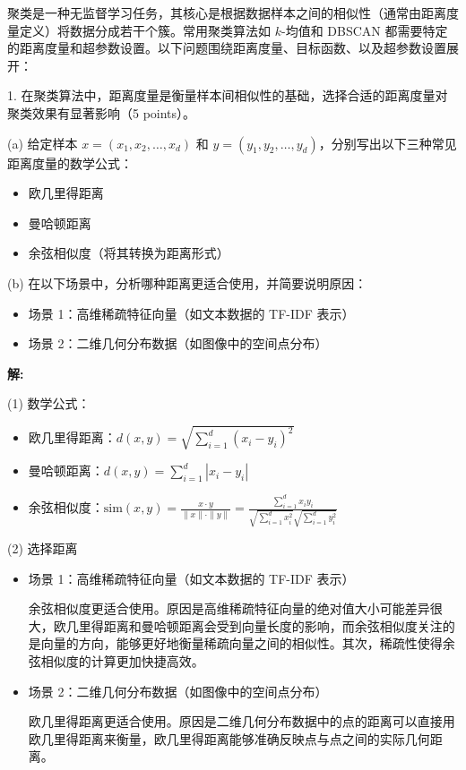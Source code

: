 \documentclass[8pt]{article}
\begin{document}
聚类是一种无监督学习任务，其核心是根据数据样本之间的相似性（通常由距离度量定义）将数据分成若干个簇。常用聚类算法如 \( k \)-均值和 DBSCAN 都需要特定的距离度量和超参数设置。以下问题围绕距离度量、目标函数、以及超参数设置展开：  

1. 
在聚类算法中，距离度量是衡量样本间相似性的基础，选择合适的距离度量对聚类效果有显著影响（5 points）。  

(a) 给定样本 \( x = (x_1, x_2, \dots, x_d) \) 和 \( y = (y_1, y_2, \dots, y_d) \)，分别写出以下三种常见距离度量的数学公式： 
\begin{itemize}
    \item 欧几里得距离  
    \item 曼哈顿距离
    \item 余弦相似度（将其转换为距离形式）  
\end{itemize}

(b) 在以下场景中，分析哪种距离更适合使用，并简要说明原因：  
\begin{itemize}
    \item 场景 1：高维稀疏特征向量（如文本数据的 TF-IDF 表示）   
    \item 场景 2：二维几何分布数据（如图像中的空间点分布）  
\end{itemize}

\textbf{\large 解:}

(1) 数学公式：
\begin{itemize}
    \item 欧几里得距离：\( d(x, y) = \sqrt{\sum_{i=1}^d (x_i - y_i)^2} \)
    \item 曼哈顿距离：\( d(x, y) = \sum_{i=1}^d |x_i - y_i| \)
    \item 余弦相似度：\( \text{sim}(x, y) = \frac{x \cdot y}{\|x\| \cdot \|y\|} = \frac{\sum_{i=1}^{d}{x_i y_i}}{
        \sqrt{\sum_{i=1}^{d}{x_i^2}} \sqrt{\sum_{i=1}^{d}{y_i^2}}
    } \) 
\end{itemize}

(2) 选择距离

\begin{itemize}
    \item 场景 1：高维稀疏特征向量（如文本数据的 TF-IDF 表示）

    余弦相似度更适合使用。原因是高维稀疏特征向量的绝对值大小可能差异很大，欧几里得距离和曼哈顿距离会受到向量长度的影响，而余弦相似度关注的是向量的方向，能够更好地衡量稀疏向量之间的相似性。其次，稀疏性使得余弦相似度的计算更加快捷高效。

    \item 场景 2：二维几何分布数据（如图像中的空间点分布）

    欧几里得距离更适合使用。原因是二维几何分布数据中的点的距离可以直接用欧几里得距离来衡量，欧几里得距离能够准确反映点与点之间的实际几何距离。
\end{itemize}
\vspace{3em}
\end{document}

